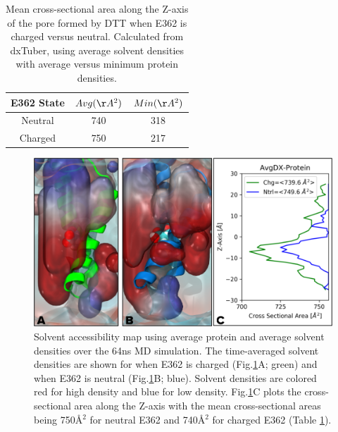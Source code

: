 \begin{table}[H]
\centering
\caption[Cross-sectional area of DTT pore]{Mean cross-sectional area along the Z-axis of the pore formed by DTT when E362 is charged versus neutral. Calculated from dxTuber\cite{raunest2011dxtuber}, using average solvent densities with average versus minimum protein densities.}
\label{tbl:dtt_pore}
\begin{tabular}{|c|c|c|}
\hline
\textbf{E362 State}  & \boldmath$Avg(\AA^{2})$ & \boldmath$Min(\AA^{2})$ \\ \hline
Neutral & 740 & 318 \\ \hline
Charged & 750 & 217 \\ \hline
\end{tabular}
\end{table}

\begin{figure}[H]
\centering
\includegraphics[width=\linewidth,]{Figures/DTT/avgdx.png}
\caption[Solvent accessibility of DTT pore]{Solvent accessibility map using average protein and average solvent densities over the 64ns MD simulation. The time-averaged solvent densities are shown for when E362 is charged (Fig.\ref{fig:dtt_avgdx}A; green) and when E362 is neutral (Fig.\ref{fig:dtt_avgdx}B; blue). Solvent densities are colored red for high density and blue for low density. Fig.\ref{fig:dtt_avgdx}C plots the cross-sectional area along the Z-axis with the mean cross-sectional areas being 750\AA$^2$ for neutral E362 and 740\AA$^2$ for charged E362 (Table \ref{tbl:dtt_pore}).}
\label{fig:dtt_avgdx}
\end{figure}

